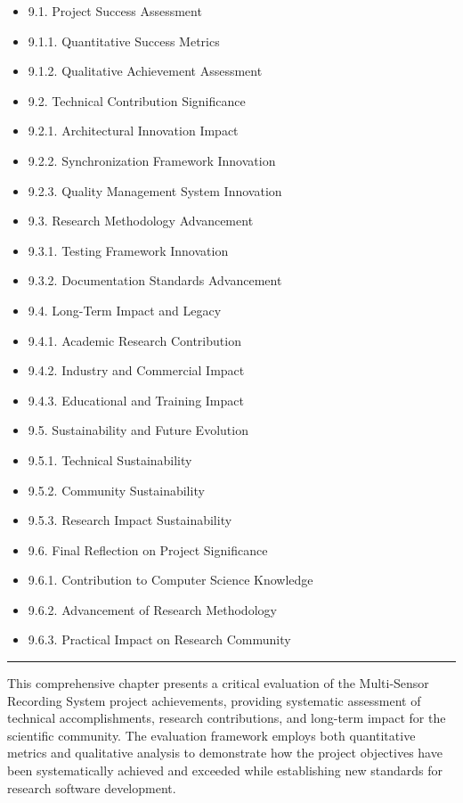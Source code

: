 \documentclass[11pt,a4paper]{report}
\begin{document}
\begin{itemize}
\item 9.1. Project Success Assessment
\item 9.1.1. Quantitative Success Metrics
\item 9.1.2. Qualitative Achievement Assessment
\item 9.2. Technical Contribution Significance
\item 9.2.1. Architectural Innovation Impact
\item 9.2.2. Synchronization Framework Innovation
\item 9.2.3. Quality Management System Innovation
\item 9.3. Research Methodology Advancement
\item 9.3.1. Testing Framework Innovation
\item 9.3.2. Documentation Standards Advancement
\item 9.4. Long-Term Impact and Legacy
\item 9.4.1. Academic Research Contribution
\item 9.4.2. Industry and Commercial Impact
\item 9.4.3. Educational and Training Impact
\item 9.5. Sustainability and Future Evolution
\item 9.5.1. Technical Sustainability
\item 9.5.2. Community Sustainability
\item 9.5.3. Research Impact Sustainability
\item 9.6. Final Reflection on Project Significance
\item 9.6.1. Contribution to Computer Science Knowledge
\item 9.6.2. Advancement of Research Methodology
\item 9.6.3. Practical Impact on Research Community

\end{itemize}
\hrule

This comprehensive chapter presents a critical evaluation of the Multi-Sensor Recording System project achievements,
providing systematic assessment of technical accomplishments, research contributions, and long-term impact for the
scientific community. The evaluation framework employs both quantitative metrics and qualitative analysis to demonstrate
how the project objectives have been systematically achieved and exceeded while establishing new standards for research
software development.
\end{document}
